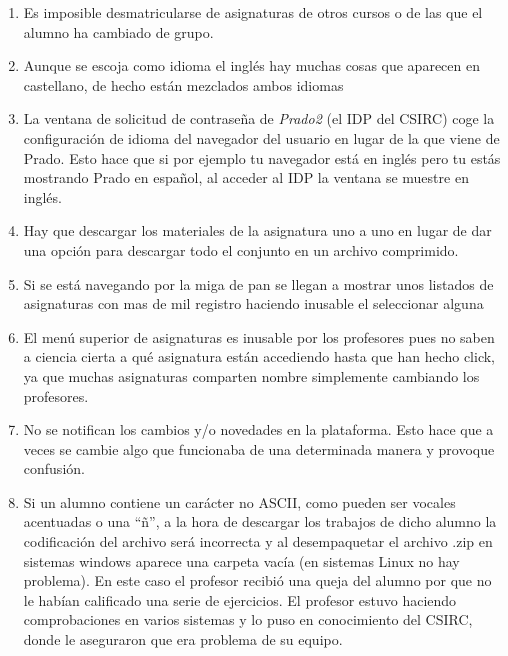 \begin{enumerate}

\item Es imposible desmatricularse de asignaturas de otros cursos o de las que el alumno ha cambiado de grupo.

\item Aunque se escoja como idioma el inglés hay muchas cosas que aparecen en castellano, de hecho están mezclados ambos idiomas

\item La ventana de solicitud de contraseña de \textit{Prado2} (el IDP del CSIRC) coge la configuración de idioma del navegador del usuario en lugar de la que viene de Prado. Esto hace que si por ejemplo tu navegador está en inglés pero tu estás mostrando Prado en español, al acceder al IDP la ventana se muestre en inglés.

\item Hay que descargar los materiales de la asignatura uno a uno en lugar de dar una opción para descargar todo el conjunto en un archivo comprimido.

\item Si se está navegando por la miga de pan se llegan a mostrar unos listados de asignaturas con mas de mil registro haciendo inusable el seleccionar alguna

\item El menú superior de asignaturas es inusable por los profesores pues no saben a ciencia cierta a qué asignatura están accediendo hasta que han hecho click, ya que muchas asignaturas comparten nombre simplemente cambiando los profesores.

\item No se notifican los cambios y/o novedades en la plataforma. Esto hace que a veces se cambie algo que funcionaba de una determinada manera y provoque confusión.

\item Si un alumno contiene un carácter no ASCII, como pueden ser vocales acentuadas o una ``ñ'', a la hora de descargar los trabajos de dicho alumno la codificación del archivo será incorrecta y al desempaquetar el archivo .zip en sistemas windows aparece una carpeta vacía (en sistemas Linux no hay problema). En este caso el profesor recibió una queja del alumno por que no le habían calificado una serie de ejercicios. El profesor estuvo haciendo comprobaciones en varios sistemas y lo puso en conocimiento del CSIRC, donde le aseguraron que era problema de su equipo. 


\end{enumerate}
